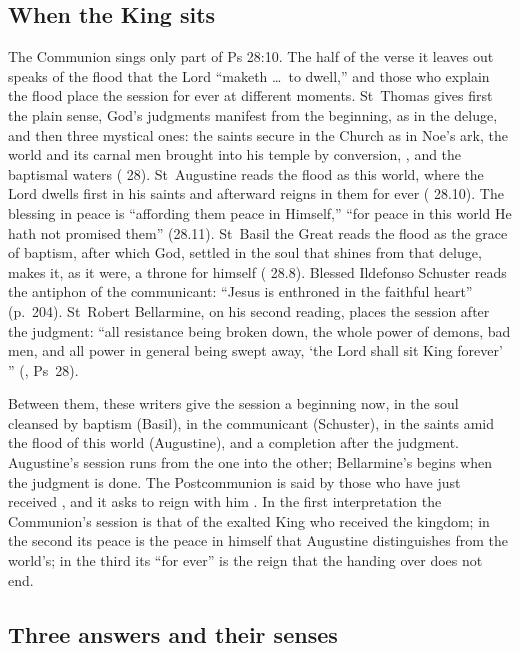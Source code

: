 \subsection{When the King sits}

The Communion sings only part of Ps 28:10. The half of the verse it leaves out speaks of the flood that
the Lord ``maketh \dots\ to dwell,'' and those who explain the flood place
the session for ever at different moments. St~Thomas gives first the
plain sense, God's judgments manifest from the beginning, as in the deluge,
and then three mystical ones: the saints secure in the Church as in Noe's ark,
the world and its carnal men brought into his temple by conversion, , and the baptismal waters ( 28). St~Augustine reads the flood as this world, where the Lord
dwells first in his saints and afterward reigns in them for ever
( 28.10). The blessing in peace is ``affording
them peace in Himself,'' ``for
peace in this world He hath not promised them'' (28.11). St~Basil the Great
reads the flood as the grace of baptism, after which God, settled in the soul
that shines from that deluge, makes it, as it were, a throne for himself
( 28.8). Blessed Ildefonso Schuster reads the
antiphon of the communicant: ``Jesus is enthroned in the faithful heart''
(p.~204). St~Robert Bellarmine, on his second reading, places the session
after the judgment: ``all resistance being broken down, the whole power of
demons, bad men, and all power in general being swept away, `the Lord shall
sit King forever' '' (, Ps~28).

Between them, these writers give the session a beginning now, in the soul cleansed by
baptism (Basil), in the communicant (Schuster), in the saints amid the flood of
this world (Augustine), and a completion after the judgment. Augustine's
session runs from the one into the other; Bellarmine's begins when the
judgment is done. The Postcommunion is said by those who have just received
, and it asks to reign with him . In the first interpretation the Communion's session is that of
the exalted King who received the kingdom; in the second its peace is the peace in himself that Augustine distinguishes
from the world's; in the third its ``for ever'' is the reign that the
handing over does not end.

\subsection{Three answers and their senses}

